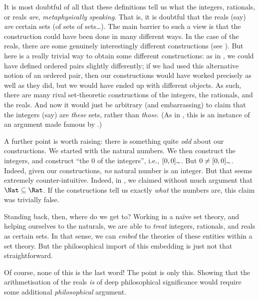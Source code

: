 \documentclass[../../../include/open-logic-section]{subfiles}
\begin{document}
It is most doubtful of all that these definitions tell us what the
integers, rationals, or reals \emph{are}, \emph{metaphysically
speaking}. That is, it is doubtful that the reals (say) \emph{are}
certain sets (of sets of sets\ldots). The main barrier to such a view
is that the construction could have been done in many different ways.
In the case of the reals, there are some genuinely interestingly
different constructions (see ). But here is a
really trivial way to obtain some different constructions: as in
, we could have defined ordered pairs
slightly differently; if we had used this alternative notion of an
ordered pair, then our constructions would have worked precisely as
well as they did, but we would have ended up with different objects.
As such, there are many rival set-theoretic constructions of the
integers, the rationals, and the reals. And now it would just be
arbitrary (and embarrassing) to claim that the integers (say) are
\emph{these} sets, rather than \emph{those}. (As in
, this is an instance of an argument made
famous by \citealt{Benacerraf1965}.)

A further point is worth raising: there is something quite \emph{odd}
about our constructions. We started with the natural numbers. We then
construct the integers, and construct ``the $0$ of the integers'',
i.e., $ [0,0]_{\sim}$. But $0 \neq
[0,0]_{\sim}$. Indeed,  given our constructions,
\emph{no} natural number is an integer. But that seems extremely
counter-intuitive. Indeed, in , we claimed
without much argument that $\Nat \subseteq \Rat$. If the constructions
tell us exactly \emph{what} the numbers are, this claim was trivially
false. 

Standing back, then, where do we get to? Working in a na\"ive set
theory, and helping ourselves to the naturals, we are able to
\emph{treat} integers, rationals, and reals as certain sets. In that
sense, we can \emph{embed} the theories of these entities within a set
theory. But the philosophical import of this embedding is just not
that straightforward. 

Of course, none of this is the last word!{} The point is only this.
Showing that the arithmetisation of the reals \emph{is} of deep
philosophical significance would require some additional
\emph{philosophical} argument.

\end{document}
